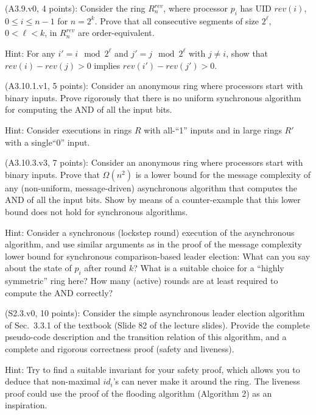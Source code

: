 \begin{Exc}{(A3.9.v0, 4 points):}
Consider the ring $R_n^{rev}$, where processor $p_i$ has UID
$rev(i)$, $0\leq i \leq n-1$ for $n=2^k$. Prove that all
consecutive segments of size $2^\ell$, $0<\ell < k$, in $R_n^{rev}$
are order-equivalent.

\normalfont
Hint: For any $i'=i \mod 2^\ell$ and $j'=j \mod 2^\ell$ with $j\neq i$,
show that $rev(i) - rev(j)>0$ implies $rev(i') - rev(j')>0$.
\end{Exc}
\begin{Exc}{(A3.10.1.v1, 5 points):}
Consider an anonymous ring where processors start with binary
inputs. Prove rigorously that there is no uniform synchronous
algorithm for computing the AND of all the input bits.

\normalfont
Hint: Consider executions in rings $R$ with all-``1'' inputs and
in large rings $R'$ with a single``0'' input.
\end{Exc}
\begin{Exc}{(A3.10.3.v3, 7 points):}
Consider an anonymous ring where processors start with binary
inputs. Prove that $\Omega(n^2)$ is a lower bound for the
message complexity of any (non-uniform, message-driven)
asynchronous algorithm that computes the AND of all the
input bits. Show by means of a counter-example that this
lower bound does not hold for synchronous algorithms.

\normalfont
Hint: Consider a synchronous (lockstep round) execution of the asynchronous
algorithm, and use similar arguments as in the proof of the message complexity lower bound
for synchronous comparison-based leader election: What can you say about the state of $p_i$ after
round $k$? What is a suitable choice for a ``highly symmetric'' ring here? How many
(active) rounds are at least required to compute the AND correctly?
\end{Exc}
\begin{Exc}{(S2.3.v0, 10 points):}
Consider the simple asynchronous leader election algorithm of Sec.~3.3.1 of
the textbook (Slide 82 of the lecture slides). Provide the complete
pseudo-code description and the transition relation of this algorithm,
and a complete and rigorous correctness proof (safety and liveness).

\normalfont
Hint: Try to find a suitable invariant for your safety proof, which allows
you to deduce that non-maximal $id_i$'s can never make it around the ring.
The liveness proof could use the proof of the flooding algorithm
(Algorithm 2) as an inspiration.
\end{Exc}
